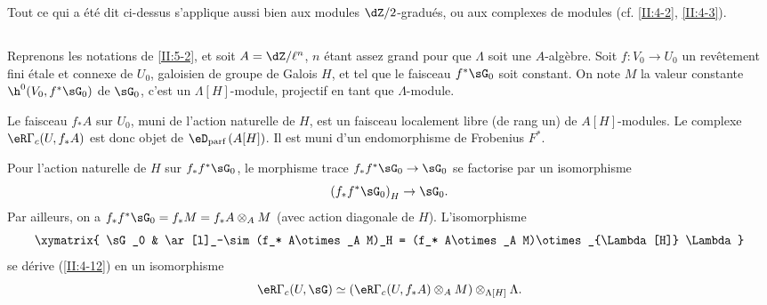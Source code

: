 Tout ce qui a été dit ci-dessus s'applique aussi bien aux modules 
$\dZ/2$-gradués, ou aux complexes de modules (cf. \ref{II:4-2}, \ref{II:4-3}). 





\subsection{}\label{II:5-12}

Reprenons les notations de \ref{II:5-2}, et soit $A=\dZ/\ell^n$, $n$ étant 
assez grand pour que $\Lambda$ soit une $A$-algèbre. Soit $f:V_0\to U_0$ un 
revêtement fini étale et connexe de $U_0$, galoisien de groupe de Galois 
$H$, et tel que le faisceau $f^*\sG_0$ soit constant. On note $M$ la valeur 
constante $\h^0(V_0,f^*\sG_0)$ de $\sG_0$, c'est un $\Lambda[H]$-module, projectif en 
tant que $\Lambda$-module. 

Le faisceau $f_* A$ sur $U_0$, muni de l'action naturelle de $H$, est un 
faisceau localement libre (de rang un) de $A[H]$-modules. Le complexe 
$\eR\Gamma_c(U,f_* A)$ est donc objet de $\eD_\text{parf}\left(A[H]\right)$. Il 
est muni d'un endomorphisme de Frobenius $F^*$. 

Pour l'action naturelle de $H$ sur $f_* f^*\sG_0$, le morphisme trace 
$f_* f^*\sG_0\to\sG_0$ se factorise par un isomorphisme 
\[
  \left(f_* f^*\sG_0\right)_H \to \sG_0 \text{.}
\]
Par ailleurs, on a $f_* f^*\sG_0=f_* M=f_* A\otimes_A M$ (avec action diagonale de 
$H$). L'isomorphisme 
\[\xymatrix{
  \sG_0 
    & \ar[l]_-\sim (f_* A\otimes_A M)_H = (f_* A\otimes_A M)\otimes_{\Lambda[H]} \Lambda
}\]
se dérive (\ref{II:4-12}) en un isomorphisme 
\[
  \eR\Gamma_c(U,\sG) \simeq \left(\eR\Gamma_c(U,f_* A)\otimes_A M\right)\otimes_{\Lambda[H]} \Lambda \text{.}
\]

